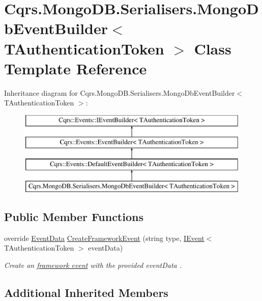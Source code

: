 \hypertarget{classCqrs_1_1MongoDB_1_1Serialisers_1_1MongoDbEventBuilder}{}\section{Cqrs.\+Mongo\+D\+B.\+Serialisers.\+Mongo\+Db\+Event\+Builder$<$ T\+Authentication\+Token $>$ Class Template Reference}
\label{classCqrs_1_1MongoDB_1_1Serialisers_1_1MongoDbEventBuilder}
Inheritance diagram for Cqrs.\+Mongo\+D\+B.\+Serialisers.\+Mongo\+Db\+Event\+Builder$<$ T\+Authentication\+Token $>$\+:\begin{figure}[H]
\begin{center}
\leavevmode
\includegraphics[height=4.000000cm]{classCqrs_1_1MongoDB_1_1Serialisers_1_1MongoDbEventBuilder}
\end{center}
\end{figure}
\subsection*{Public Member Functions}
\begin{DoxyCompactItemize}
\item 
override \hyperlink{classCqrs_1_1Events_1_1EventData}{Event\+Data} \hyperlink{classCqrs_1_1MongoDB_1_1Serialisers_1_1MongoDbEventBuilder_a06afbb994fd3f679f275dea3d1d60c6e_a06afbb994fd3f679f275dea3d1d60c6e}{Create\+Framework\+Event} (string type, \hyperlink{interfaceCqrs_1_1Events_1_1IEvent}{I\+Event}$<$ T\+Authentication\+Token $>$ event\+Data)
\begin{DoxyCompactList}\small\item\em Create an \hyperlink{}{framework event} with the provided {\itshape event\+Data} . \end{DoxyCompactList}\end{DoxyCompactItemize}
\subsection*{Additional Inherited Members}



